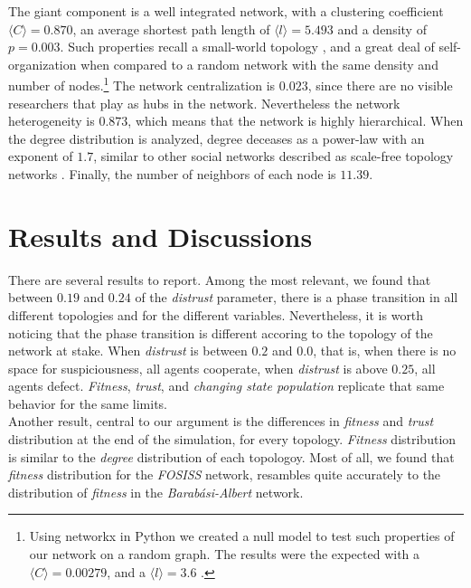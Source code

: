 The giant component is a well integrated network, with a clustering
coefficient $\langle C \rangle = 0.870$, an average shortest path
length of $\langle l \rangle = 5.493$ and a density of $p = 0.003$. Such
properties recall a small-world topology \cite{Watts1998}, and a great
deal of self-organization when compared to a random network with the
same density and number of nodes.\footnote{Using networkx in Python we
created a null model to test such properties of our network on a
random graph. The results were the expected with a $\langle C
\rangle = 0.00279$, and a $\langle l \rangle = 3.6$
\cite{Watts1998}.} The network centralization is $0.023$, since there
are no visible researchers that play as hubs in the network.
Nevertheless the network heterogeneity is $0.873$, which means that
the network is highly hierarchical. When the degree distribution is
analyzed, degree deceases as a power-law with an exponent of $1.7$,
similar to other social networks described as scale-free topology
networks \cite{Barabasi1999}. Finally, the number of neighbors of each
node is $11.39$.\\  



\section{Results and Discussions}
\label{sec:3}

There are several results to report. Among the most relevant, we found that between $0.19$ and $0.24$ of the \textit{distrust} parameter, there is a phase transition in all different topologies and for the different variables. Nevertheless, it is worth noticing that the phase transition is different accoring to the topology of the network at stake. When \textit{distrust} is between $0.2$ and $0.0$, that is, when there is no space for suspiciousness, all agents cooperate, when \textit{distrust} is above $0.25$, all agents defect. \textit{Fitness}, \textit{trust}, and \textit{changing state population} replicate that  same behavior for the same limits. \\

Another result, central to our argument is the differences in \textit{fitness} and \textit{trust} distribution at the end of the simulation, for every topology. \textit{Fitness} distribution is similar to the \textit{degree} distribution of each topologoy. Most of all, we found that \textit{fitness} distribution for the \textit{FOSISS} network, resambles quite accurately to the distribution of \textit{fitness} in the \textit{Barab\'asi-Albert} network.

